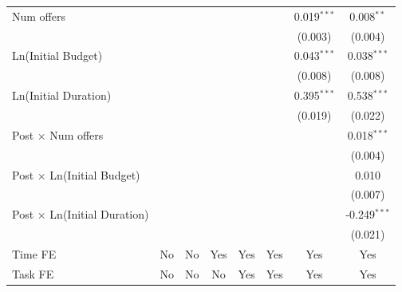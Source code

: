\documentclass[
]{article}
\begin{document}
\begin{table}[htbp]
\begin{tabular}{lccccccc}
      Num offers                          &                &                &               &               &               & 0.019$^{***}$ & 0.008$^{**}$\\   
                                          &                &                &               &               &               & (0.003)       & (0.004)\\   
      Ln(Initial Budget)                  &                &                &               &               &               & 0.043$^{***}$ & 0.038$^{***}$\\   
                                          &                &                &               &               &               & (0.008)       & (0.008)\\   
      Ln(Initial Duration)                &                &                &               &               &               & 0.395$^{***}$ & 0.538$^{***}$\\   
                                          &                &                &               &               &               & (0.019)       & (0.022)\\   
      Post $\times$ Num offers            &                &                &               &               &               &               & 0.018$^{***}$\\   
                                          &                &                &               &               &               &               & (0.004)\\   
      Post $\times$ Ln(Initial Budget)    &                &                &               &               &               &               & 0.010\\   
                                          &                &                &               &               &               &               & (0.007)\\   
      Post $\times$ Ln(Initial Duration)  &                &                &               &               &               &               & -0.249$^{***}$\\   
                                          &                &                &               &               &               &               & (0.021)\\   
      Time FE                             & No             & No             & Yes           & Yes           & Yes           & Yes           & Yes\\  
      Task FE                             & No             & No             & No            & Yes           & Yes           & Yes           & Yes\\  

\end{tabular}
\end{table}
\end{document}
